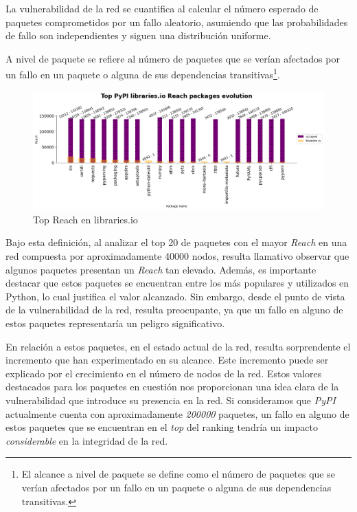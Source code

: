 La vulnerabilidad de la red se cuantifica al calcular el número esperado de paquetes comprometidos
por un fallo aleatorio, asumiendo que las probabilidades de fallo son independientes y siguen
una distribución uniforme.

A nivel de paquete se refiere al número de paquetes que se verían afectados por un fallo en un
paquete o alguna de sus dependencias transitivas\footnote{El alcance a nivel de paquete se
    define como el número de paquetes que se verían afectados por un fallo en un paquete o alguna
    de sus dependencias transitivas.}.

\begin{figure}[h!]
    \begin{center}
        \includegraphics[width=1\textwidth]{img/pypi/top_librariesio_reach_evolution.png}
        \caption{Top Reach en libraries.io}
    \end{center}
\end{figure}


Bajo esta definición, al analizar el top 20 de paquetes con el mayor \textit{Reach} en una red compuesta por aproximadamente 40000 nodos, resulta llamativo observar que algunos paquetes
presentan un \textit{Reach} tan elevado. Además, es importante destacar que estos paquetes se
encuentran entre los más populares y utilizados en Python, lo cual justifica el valor alcanzado.
Sin embargo, desde el punto de vista de la vulnerabilidad de la red, resulta preocupante, ya que
un fallo en alguno de estos paquetes representaría un peligro significativo.

En relación a estos paquetes, en el estado actual de la red, resulta sorprendente el incremento
que han experimentado en su alcance. Este incremento puede ser explicado por el crecimiento en el
número de nodos de la red. Estos valores destacados para los paquetes en cuestión nos proporcionan
una idea clara de la vulnerabilidad que introduce su presencia en la red. Si consideramos que
\textit{PyPI} actualmente cuenta con aproximadamente \textit{200000} paquetes, un fallo en alguno de estos paquetes
que se encuentran en el \textit{top} del ranking tendría un impacto \textit{considerable} en la integridad de la red.


